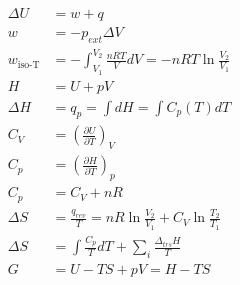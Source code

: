 \begin{align*}
\Delta U &= w + q\\
w&=-p_{ext}\Delta V\\
w_{\textrm{iso-T}}&=-\int_{V_1}^{V_2}\frac{nRT}{V}dV=-nRT\ln\frac{V_2}{V_1}\\
H &= U + pV\\
\Delta H &= q_p = \int dH=\int C_p(T)dT\\
C_V&=\left(\frac{\partial U}{\partial T}\right)_V\\
C_p&=\left(\frac{\partial H}{\partial T}\right)_p\\
C_p&=C_V+nR\\
\Delta S &= \frac{q_{rev}}{T}= nR\ln \frac{V_2}{V_1} + C_V \ln \frac{T_2}{T_1}\\
\Delta S &= \int \frac{C_p}{T} dT + \sum_i\frac{\Delta_{trs} H}{T}\\
G& = U - TS + pV = H -TS\\ %
\end{align*}
